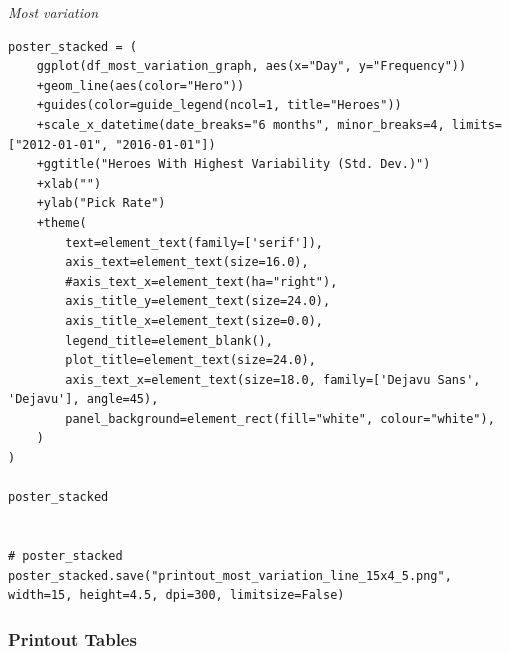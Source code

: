 \emph{Most variation}
\begin{verbatim}
poster_stacked = (
    ggplot(df_most_variation_graph, aes(x="Day", y="Frequency"))
    +geom_line(aes(color="Hero"))
    +guides(color=guide_legend(ncol=1, title="Heroes"))
    +scale_x_datetime(date_breaks="6 months", minor_breaks=4, limits=["2012-01-01", "2016-01-01"])
    +ggtitle("Heroes With Highest Variability (Std. Dev.)")
    +xlab("")
    +ylab("Pick Rate")
    +theme(
        text=element_text(family=['serif']),
        axis_text=element_text(size=16.0),
        #axis_text_x=element_text(ha="right"),
        axis_title_y=element_text(size=24.0),
        axis_title_x=element_text(size=0.0),
        legend_title=element_blank(),
        plot_title=element_text(size=24.0),
        axis_text_x=element_text(size=18.0, family=['Dejavu Sans', 'Dejavu'], angle=45),
        panel_background=element_rect(fill="white", colour="white"),
    )
)

poster_stacked


# poster_stacked
poster_stacked.save("printout_most_variation_line_15x4_5.png", width=15, height=4.5, dpi=300, limitsize=False)
\end{verbatim}

\subsubsection*{Printout Tables}

